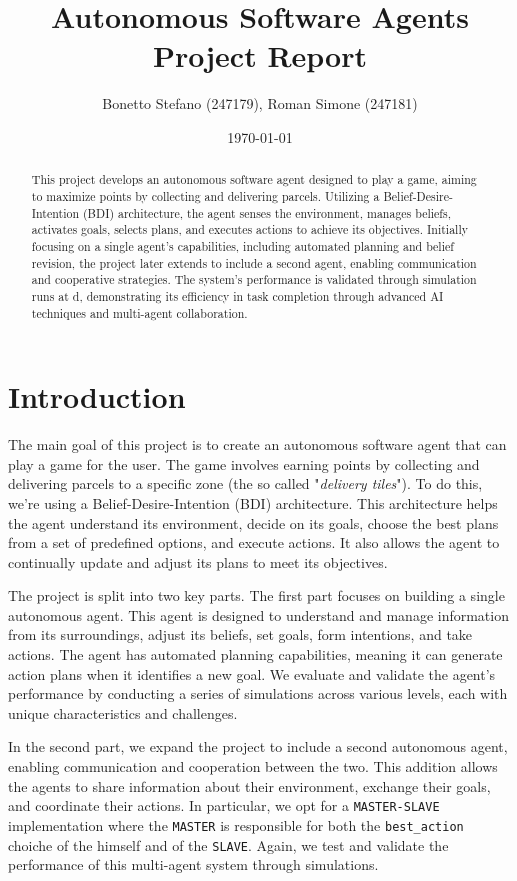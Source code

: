 \documentclass[12pt]{article}
\title{\textbf{Autonomous Software Agents Project Report}}
\author{Bonetto Stefano (247179), Roman Simone (247181)}
\date{\today}
\begin{document}
\maketitle

\begin{abstract}
    This project develops an autonomous software agent designed to play a game, aiming to maximize points by collecting and delivering parcels. Utilizing a Belief-Desire-Intention (BDI) architecture, the agent senses the environment, manages beliefs, activates goals, selects plans, and executes actions to achieve its objectives. Initially focusing on a single agent's capabilities, including automated planning and belief revision, the project later extends to include a second agent, enabling communication and cooperative strategies. The system's performance is validated through simulation runs at d, demonstrating its efficiency in task completion through advanced AI techniques and multi-agent collaboration.
\end{abstract}

\section{Introduction}

The main goal of this project is to create an autonomous software agent that can play a game for the user. The game involves earning points by collecting and delivering parcels to a specific zone (the so called "\textit{delivery tiles}"). To do this, we're using a Belief-Desire-Intention (BDI) architecture. This architecture helps the agent understand its environment, decide on its goals, choose the best plans from a set of predefined options, and execute actions. It also allows the agent to continually update and adjust its plans to meet its objectives.

The project is split into two key parts. The first part focuses on building a single autonomous agent. This agent is designed to understand and manage information from its surroundings, adjust its beliefs, set goals, form intentions, and take actions. The agent has automated planning capabilities, meaning it can generate action plans when it identifies a new goal. We evaluate and validate the agent's performance by conducting a series of simulations across various levels, each with unique characteristics and challenges.

In the second part, we expand the project to include a second autonomous agent, enabling communication and cooperation between the two. This addition allows the agents to share information about their environment, exchange their goals, and coordinate their actions. In particular, we opt for a \texttt{MASTER-SLAVE} implementation where the \texttt{MASTER} is responsible for both the \texttt{best\_action} choiche of the himself and of the \texttt{SLAVE}. Again, we test and validate the performance of this multi-agent system through simulations.
\end{document}
